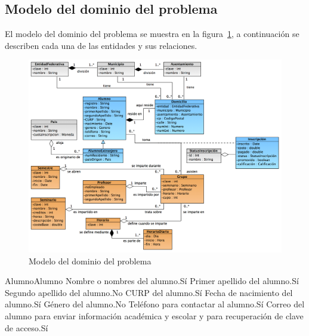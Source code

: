 \subsection{Modelo del dominio del problema}

	El modelo del dominio del problema se muestra en la figura~\ref{fig:modeloDeDominio}, a continuación se describen cada una de las entidades y sus relaciones.
	
\begin{figure}[htbp!]
	\begin{center}
		\includegraphics[angle=90,width=.95\textwidth]{images/modeloDelDominioDelProblema}
		\caption{Modelo del dominio del problema}
		\label{fig:modeloDeDominio}
	\end{center}
\end{figure}

\begin{cdtEntidad}{Alumno}{Alumno}
		{Nombre o nombres del alumno.}{Sí}
		{Primer apellido del alumno.}{Sí}
		{Segundo apellido del alumno.}{No}
		{CURP del alumno.}{Sí}
		{Fecha de nacimiento del alumno.}{Sí}
		{Género del alumno.}{No}
		{Teléfono para contactar al alumno.}{Sí}
		{Correo del alumno para enviar información académica y escolar y para recuperación de clave de acceso.}{Sí}
	\cdtEntityRelSection
\end{cdtEntidad}

